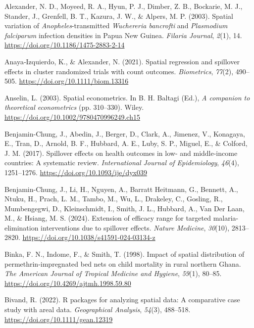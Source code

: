\documentclass[
  12pt,
  prelim]{bios-prelim}
\newlength{\cslhangindent}
\newenvironment{CSLReferences}[2] %
 {\begin{list}{}{%
  \setlength{\itemindent}{0pt}
  \setlength{\leftmargin}{0pt}
  \setlength{\parsep}{0pt}
  \ifodd #1
   \setlength{\leftmargin}{\cslhangindent}
   \setlength{\itemindent}{-1\cslhangindent}
  \fi
  \setlength{\itemsep}{#2\baselineskip}}}
 {\end{list}}
\begin{document}
\protect{}\label{refs}
\begin{CSLReferences}{1}{0}
Alexander, N. D., Moyeed, R. A., Hyun, P. J., Dimber, Z. B., Bockarie,
M. J., Stander, J., Grenfell, B. T., Kazura, J. W., \& Alpers, M. P.
(2003). Spatial variation of {\emph{Anopheles}}-transmitted
{\emph{Wuchereria bancrofti}} and {\emph{Plasmodium falciparum}}
infection densities in {Papua New Guinea}. \emph{Filaria Journal},
\emph{2}(1), 14. \url{https://doi.org/10.1186/1475-2883-2-14}

Anaya‐Izquierdo, K., \& Alexander, N. (2021). Spatial regression and
spillover effects in cluster randomized trials with count outcomes.
\emph{Biometrics}, \emph{77}(2), 490--505.
\url{https://doi.org/10.1111/biom.13316}

Anselin, L. (2003). Spatial econometrics. In B. H. Baltagi (Ed.),
\emph{A companion to theoretical econometrics} (pp. 310--330). Wiley.
\url{https://doi.org/10.1002/9780470996249.ch15}

Benjamin-Chung, J., Abedin, J., Berger, D., Clark, A., Jimenez, V.,
Konagaya, E., Tran, D., Arnold, B. F., Hubbard, A. E., Luby, S. P.,
Miguel, E., \& Colford, J. M. (2017). Spillover effects on health
outcomes in low- and middle-income countries: A systematic review.
\emph{International Journal of Epidemiology}, \emph{46}(4), 1251--1276.
\url{https://doi.org/10.1093/ije/dyx039}

Benjamin-Chung, J., Li, H., Nguyen, A., Barratt Heitmann, G., Bennett,
A., Ntuku, H., Prach, L. M., Tambo, M., Wu, L., Drakeley, C., Gosling,
R., Mumbengegwi, D., Kleinschmidt, I., Smith, J. L., Hubbard, A., Van
Der Laan, M., \& Hsiang, M. S. (2024). Extension of efficacy range for
targeted malaria-elimination interventions due to spillover effects.
\emph{Nature Medicine}, \emph{30}(10), 2813--2820.
\url{https://doi.org/10.1038/s41591-024-03134-z}

Binka, F. N., Indome, F., \& Smith, T. (1998). Impact of spatial
distribution of permethrin-impregnated bed nets on child mortality in
rural northern {Ghana}. \emph{The American Journal of Tropical Medicine
and Hygiene}, \emph{59}(1), 80--85.
\url{https://doi.org/10.4269/ajtmh.1998.59.80}

Bivand, R. (2022). {R} packages for analyzing spatial data: A
comparative case study with areal data. \emph{Geographical Analysis},
\emph{54}(3), 488--518. \url{https://doi.org/10.1111/gean.12319}


\end{CSLReferences}
\end{document}
